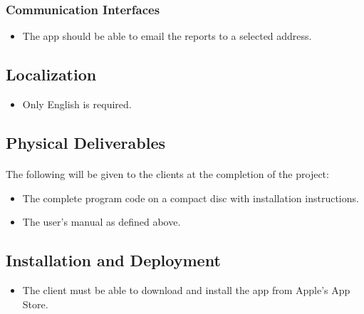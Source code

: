 \subsubsection{Communication Interfaces}
\begin{itemize}
\item The app should be able to email the reports to a selected address.
\end{itemize}
\subsection{Localization}
\begin{itemize}
\item Only English is required.
\end{itemize}
\subsection{Physical Deliverables}
\paragraph{}The following will be given to the clients at the completion of the project:
\begin{itemize}
\item The complete program code on a compact disc with installation instructions.
\item The user's manual as defined above.
\end{itemize}
\subsection{Installation and Deployment}
\begin{itemize}
\item The client must be able to download and install the app from Apple's App Store.
\end{itemize}